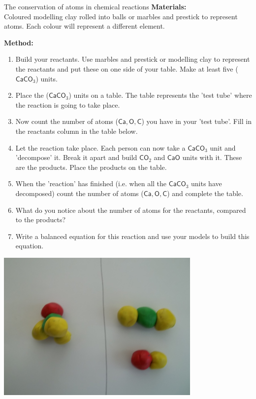             \begin{activity}{The conservation of atoms in chemical reactions }
            \nopagebreak
            \label{m38711*id64844}\noindent
\textbf{Materials:} \\ Coloured modelling clay rolled into balls or marbles and prestick to represent atoms. Each colour will represent a different element.
        \par 
      \label{m38711*id64882}\noindent
\textbf{Method:}\\
\begin{minipage}{.6\textwidth}
      \label{m38711*id64889}\begin{enumerate}[noitemsep, label=\textbf{\arabic*}. ] 
\label{m38711*uid36}\item Build your reactants. Use marbles and prestick or modelling clay to represent the reactants and put these on one side of your table. Make at least five (${\mathsf{CaCO}}_{3}$) units.
\label{m38711*uid37}\item Place the (${\mathsf{CaCO}}_{3}$) units on a table. The table represents the 'test tube' where the reaction is going to take place. 
\label{m38711*uid38}\item Now count the number of atoms ($\mathsf{Ca}, \mathsf{O}, \mathsf{C}$) you have in your 'test tube'. Fill in the reactants column in the table below. 
\label{m38711*uid39}\item Let the reaction take place. Each person can now take a ${\mathsf{CaCO}}_{3}$ unit and 'decompose' it. Break it apart and build ${\mathsf{CO}}_{2}$ and ${\mathsf{CaO}}$ units with it. These are the products. Place the products on the table.
\item When the 'reaction' has finished (i.e. when all the ${\mathsf{CaCO}}_{3}$ units have decomposed) count the number of atoms ($\mathsf{Ca}, \mathsf{O}, \mathsf{C}$) and complete the table.
\item What do you notice about the number of atoms for the reactants, compared to the products?
\item Write a balanced equation for this reaction and use your models to build this equation.
\end{enumerate}
\end{minipage}
\begin{minipage}{.4\textwidth}
 \begin{center}
 \includegraphics[width=.6\textwidth]{photos/balancing3.png}\par

\end{center}
\end{minipage}
\end{activity}
